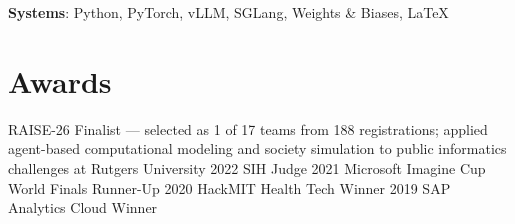 \documentclass{ExpressiveResume}
\begin{document}
\vspace{\spacesmall}
\noindent\textbf{Systems}: Python, PyTorch, vLLM, SGLang, Weights \& Biases, \LaTeX{}

\section{Awards}

 RAISE-26 Finalist --- selected as 1 of 17 teams from 188 registrations; applied agent-based computational modeling and society simulation to public informatics challenges at Rutgers University \textbar{} 2022 SIH Judge \textbar{} 2021 Microsoft Imagine Cup World Finals Runner-Up \textbar{} 2020 HackMIT Health Tech Winner \textbar{} 2019 SAP Analytics Cloud Winner
\end{document}
